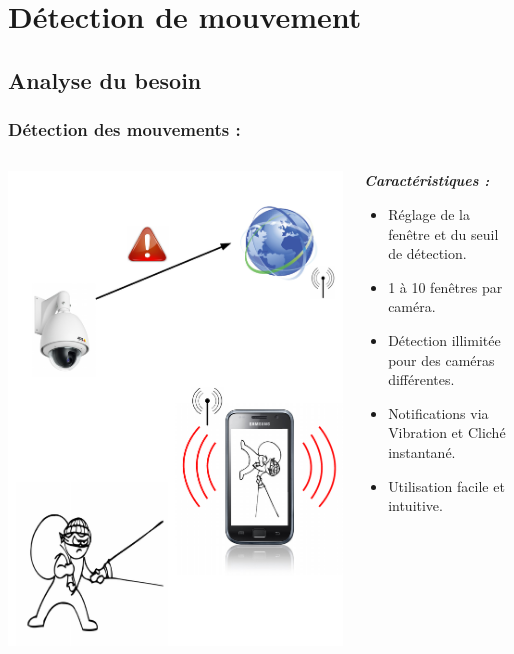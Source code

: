 
\section{Détection de mouvement}
 \subsection{Analyse du besoin}
  \begin{frame}
   \frametitle{Détection des mouvements :}



\begin{columns}
\begin{column}{5cm}

   \includegraphics[scale=0.25]{Images/ImageSlide10.pdf}
\end{column}
\begin{column}{7cm}
\textbf{\textit{Caractéristiques :}} 
\begin{itemize}
    \item Réglage de la fenêtre et du seuil de détection.
  	\item 1 à 10 fenêtres par caméra.
  	\item Détection illimitée pour des caméras différentes.
 	\item Notifications via Vibration et Cliché instantané.
 	\item Utilisation facile et intuitive.
\end{itemize}
\end{column}
\end{columns}
  \end{frame}
